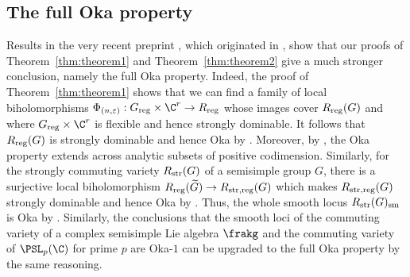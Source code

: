 \documentclass[12pt, a4paper, oneside]{amsart}
\theoremstyle{plain} %
\theoremstyle{definition} %
\theoremstyle{remark} %
\begin{document}
\makeatletter
\begingroup
\let\@tocwrite\@gobbletwo

\subsection*{The full Oka property}
Results in the very recent preprint \cite{ADG26}, which originated in \cite{Ope26}, show that our proofs of Theorem~\ref{thm:theorem1} and Theorem~\ref{thm:theorem2} give a much stronger conclusion, namely the full Oka property. Indeed, the proof of Theorem~\ref{thm:theorem1} shows that we can find a family of local biholomorphisms $\Phi_{(n,\varepsilon)}: G_{\rm reg}\times \C^r\to R_{\rm reg}$ whose images cover $R_{\rm reg}(G)$ and where $G_{\rm reg}\times \C^r$ is flexible and hence strongly dominable. It follows that $R_{\rm reg}(G)$ is strongly dominable and hence Oka by \cite[Theorem 1.4]{ADG26}. Moreover, by \cite[Theorem 1.8]{ADG26}, the Oka property extends across analytic subsets of positive codimension. Similarly, for the strongly commuting variety $R_{\rm str}(G)$ of a semisimple group $G$, there is a surjective local biholomorphism $R_{\rm reg}(\widetilde{G})\to R_{\rm str, reg}(G)$ which makes $R_{\rm str,reg}(G)$ strongly dominable and hence Oka by \cite[Theorem 1.4]{ADG26}. Thus, the whole smooth locus $R_{\rm str}(G)_{\rm sm}$ is Oka by \cite[Theorem 1.8]{ADG26}. Similarly, the conclusions that the smooth loci of the commuting variety of a complex semisimple Lie algebra $\frakg$ and the commuting variety of $\PSL_p(\C)$ for prime $p$ are Oka-$1$ can be upgraded to the full Oka property by the same reasoning.
\par
\endgroup
\makeatother






\makeatletter
\begingroup
\let\@tocwrite\@gobbletwo
\end{document}
